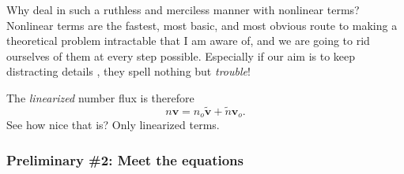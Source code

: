 Why deal in such a ruthless and merciless manner with nonlinear terms? Nonlinear
terms are the fastest, most basic, and most obvious route to making a
theoretical problem intractable that I am aware of, and we are going to rid
ourselves of them at every step possible. Especially if our aim is to keep
distracting details , they spell nothing but \emph{trouble}!

The \emph{linearized} number flux is therefore
\begin{equation}
  n \mathbf{v} = n_o \mathbf{\tilde v} + \tilde n \mathbf{v}_o.
\end{equation}
See how nice that is? Only linearized terms.

\subsubsection{Preliminary \#2: Meet the equations}

